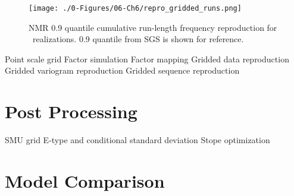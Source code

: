 \begin{figure}[htb!]
    \centering
    \texttt{[image: ./0-Figures/06-Ch6/repro\_gridded\_runs.png]}
    \caption{\gls{NMR} 0.9 quantile cumulative run-length frequency reproduction for \csnreals \ realizations. 0.9 quantile from \gls{SGS} is shown for reference.}
    \label{fig:repro_gridded_runs}
\end{figure}



Point scale grid
Factor simulation
Factor mapping
Gridded data reproduction
Gridded variogram reproduction
Gridded sequence reproduction


\FloatBarrier
\section{Post Processing}
\label{sec:post}

SMU grid
E-type and conditional standard deviation
Stope optimization

\FloatBarrier
\section{Model Comparison}
\label{sec:compare}